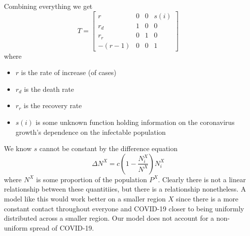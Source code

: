 \documentclass{report}
\begin{document}
                \newline\indent
                Combining everything we get
                \begin{equation}
                    T = \begin{bmatrix}
                        r & 0 & 0 & s(i) \\
                        r_d & 1 & 0 & 0 \\
                        r_r & 0 & 1 & 0 \\
                        -(r - 1) & 0 & 0 & 1
                    \end{bmatrix}
                \end{equation}
                where
                \begin{itemize}
                    \item $r$ is the rate of increase (of cases)
                    \item $r_d$ is the death rate
                    \item $r_r$ is the recovery rate
                    \item $s(i)$ is some unknown function holding information on the coronavirus growth's dependence on the infectable population
                \end{itemize}
                We know $s$ cannot be constant by the difference equation
                $$\Delta N^X = c(1 - \dfrac{N^X_i}{N^X})N^X_i$$
                where $N^X$ is some proportion of the population $P^X$. Clearly there is not a linear relationship between these quantitiies, but there is a relationship nonetheless. 
                \newline\indent
                A model like this would work better on a smaller region $X$ since there is a more constant contact throughout everyone and COVID-19 closer to being uniformly distributed across a smaller region. Our model does not account for a non-uniform spread of COVID-19.
\end{document}
